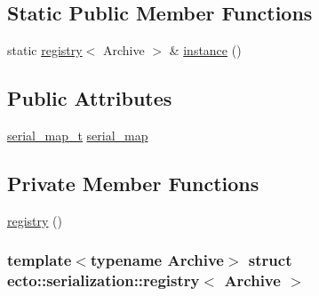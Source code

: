 \subsection*{\-Static \-Public \-Member \-Functions}
\begin{DoxyCompactItemize}
\item 
static \hyperlink{structecto_1_1serialization_1_1registry}{registry}$<$ \-Archive $>$ \& \hyperlink{structecto_1_1serialization_1_1registry_a19aae99a3cc5ddb4b56d069faf01e300}{instance} ()
\end{DoxyCompactItemize}
\subsection*{\-Public \-Attributes}
\begin{DoxyCompactItemize}
\item 
\hyperlink{structecto_1_1serialization_1_1registry_a89253dc4749e297b132dacb9e14967c2}{serial\-\_\-map\-\_\-t} \hyperlink{structecto_1_1serialization_1_1registry_a7ef09466a24edc21695e3905c0a7921b}{serial\-\_\-map}
\end{DoxyCompactItemize}
\subsection*{\-Private \-Member \-Functions}
\begin{DoxyCompactItemize}
\item 
\hyperlink{structecto_1_1serialization_1_1registry_acbf5b14a8ef87e8a1324ad852e3e3f13}{registry} ()
\end{DoxyCompactItemize}
\subsubsection*{template$<$typename \-Archive$>$ struct ecto\-::serialization\-::registry$<$ Archive $>$}



